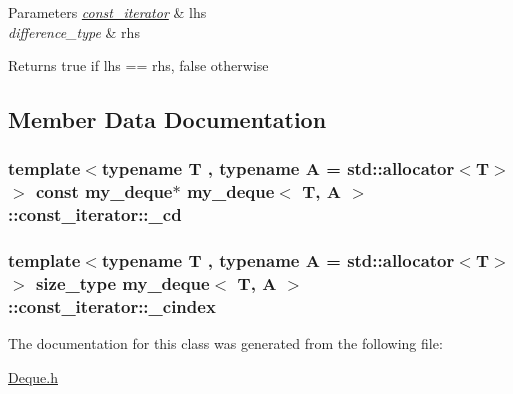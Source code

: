 \begin{DoxyParams}{Parameters}
{\em \hyperlink{classmy__deque_1_1const__iterator}{const\-\_\-iterator}} & lhs \\
\hline
{\em difference\-\_\-type} & rhs \\
\hline
\end{DoxyParams}
\begin{DoxyReturn}{Returns}
true if lhs == rhs, false otherwise 
\end{DoxyReturn}


\subsection{Member Data Documentation}
\hypertarget{classmy__deque_1_1const__iterator_ac136929fce63d854c0266a1c3b050c7b}{
\subsubsection[{\-\_\-cd}]{\setlength{\rightskip}{0pt plus 5cm}template$<$typename T , typename A  = std\-::allocator$<$\-T$>$$>$ const {\bf my\-\_\-deque}$\ast$ {\bf my\-\_\-deque}$<$ T, A $>$\-::const\-\_\-iterator\-::\-\_\-cd\hspace{0.3cm}{\ttfamily [private]}}}\label{classmy__deque_1_1const__iterator_ac136929fce63d854c0266a1c3b050c7b}
\hypertarget{classmy__deque_1_1const__iterator_aef40061c16eedaed0e048f50a380b67d}{
\subsubsection[{\-\_\-cindex}]{\setlength{\rightskip}{0pt plus 5cm}template$<$typename T , typename A  = std\-::allocator$<$\-T$>$$>$ {\bf size\-\_\-type} {\bf my\-\_\-deque}$<$ T, A $>$\-::const\-\_\-iterator\-::\-\_\-cindex\hspace{0.3cm}{\ttfamily [private]}}}\label{classmy__deque_1_1const__iterator_aef40061c16eedaed0e048f50a380b67d}


The documentation for this class was generated from the following file\-:\begin{DoxyCompactItemize}
\item 
\hyperlink{Deque_8h}{Deque.\-h}\end{DoxyCompactItemize}
